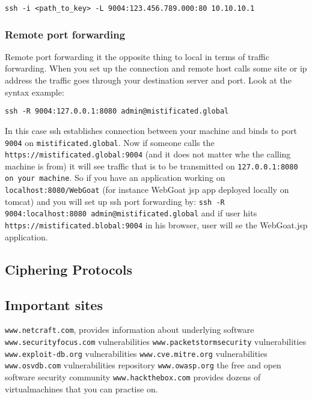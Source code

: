 \documentclass{article}[12pt]
\newcommand{\q}[1]{\texttt{#1}}
\begin{document}
{\q{ssh -i <path\_to\_key> -L 9004:123.456.789.000:80 10.10.10.1}

\subsubsection{Remote port forwarding}

Remote port forwarding it the opposite thing to local in terms of traffic forwarding.
When you set up the connection and remote host calls some site or ip address the traffic goes through your destination server and port.
Look at the syntax example: \newline\newline


\q{ssh -R 9004:127.0.0.1:8080 admin@mistificated.global}\newline\newline

In this case ssh establishes connection between your machine and binds to port \q{9004} on \q{mistificated.global}.
Now if someone calls the \q{https://mistificated.global:9004} (and it does not matter whe the calling machine is from) it will see traffic that is to be transmitted on \q{127.0.0.1:8080 on your machine}.
So if you have an application working on \q{localhost:8080/WebGoat} (for instance WebGoat jsp app deployed locally on tomcat) and you will set up ssh port forwarding by: \newline
\q{ssh -R 9004:localhost:8080 admin@mistificated.global} \newline
and if user hits \q{https://mistificated.blobal:9004} in his browser, user will se the WebGoat.jsp application.

\subsection{Ciphering Protocols}

\subsection{Important sites}
\texttt{www.netcraft.com}, provides information about underlying software
\texttt{www.securityfocus.com} vulnerabilities
\texttt{www.packetstormsecurity} vulnerabilities
\texttt{www.exploit-db.org} vulnerabilities
\texttt{www.cve.mitre.org} vulnerabilities
\texttt{www.osvdb.com} vulnerabilities repository
\texttt{www.owasp.org} the free and open software security community
\texttt{www.hackthebox.com} provides dozens of virtualmachines that you can practise on.
\texttt{}
\texttt{}
\texttt{}


}
\end{document}
